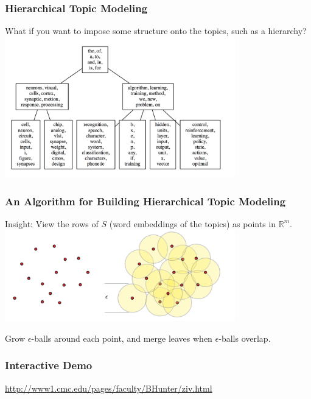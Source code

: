 \documentclass{beamer}
\begin{document}
		\begin{frame}
				\frametitle{Hierarchical Topic Modeling}
				What if you want to impose some structure onto the topics, such as a hierarchy?
					\includegraphics[width=10cm]{hierarchy}
				\end{frame}
				
					\begin{frame}
						\frametitle{An Algorithm for Building Hierarchical Topic Modeling}
						Insight: View the rows of $S$ (word embeddings of the topics) as points in $\mathbb{R}^m$. 
							\includegraphics[width=10cm]{growth}
							
							Grow $\epsilon$-balls around each point, and merge leaves when $\epsilon$-balls overlap.
					\end{frame}
					\begin{frame}
						\frametitle{Interactive Demo}
						\url{http://www1.cmc.edu/pages/faculty/BHunter/ziv.html}
					\end{frame}
					
\end{document}
